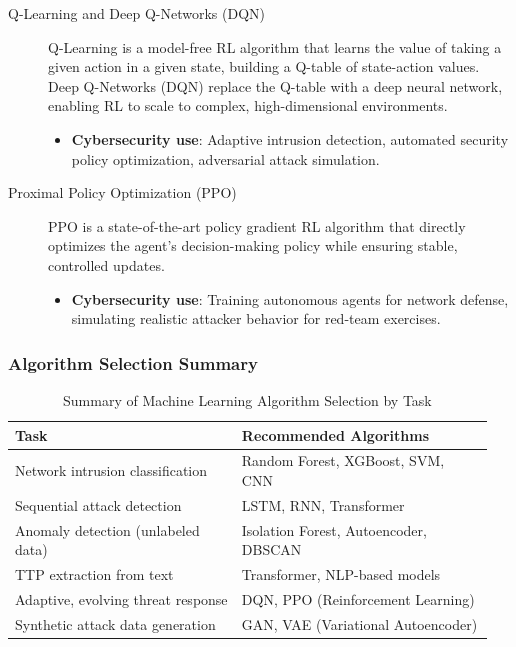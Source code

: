 \begin{description}
    \item[Q-Learning and Deep Q-Networks (DQN)] Q-Learning is a model-free RL algorithm that learns the value of taking a given action in a given state, building a Q-table of state-action values. Deep Q-Networks (DQN) replace the Q-table with a deep neural network, enabling RL to scale to complex, high-dimensional environments.
    \begin{itemize}
        \item \textbf{Cybersecurity use}: Adaptive intrusion detection, automated security policy optimization, adversarial attack simulation.
    \end{itemize}

    \item[Proximal Policy Optimization (PPO)] PPO is a state-of-the-art policy gradient RL algorithm that directly optimizes the agent's decision-making policy while ensuring stable, controlled updates.
    \begin{itemize}
        \item \textbf{Cybersecurity use}: Training autonomous agents for network defense, simulating realistic attacker behavior for red-team exercises.
    \end{itemize}
\end{description}


\subsubsection*{Algorithm Selection Summary}

\begin{table}[H]
\centering
\caption{Summary of Machine Learning Algorithm Selection by Task}
\medskip
\begin{tabular}{|p{0.45\linewidth}|p{0.5\linewidth}|}
\hline
\textbf{Task} & \textbf{Recommended Algorithms} \\ \hline
Network intrusion classification & Random Forest, XGBoost, SVM, CNN \\ \hline
Sequential attack detection & LSTM, RNN, Transformer \\ \hline
Anomaly detection (unlabeled data) & Isolation Forest, Autoencoder, DBSCAN \\ \hline
TTP extraction from text & Transformer, NLP-based models \\ \hline
Adaptive, evolving threat response & DQN, PPO (Reinforcement Learning) \\ \hline
Synthetic attack data generation & GAN, VAE (Variational Autoencoder) \\ \hline
\end{tabular}

\label{tab:alg_selection}
\end{table}

